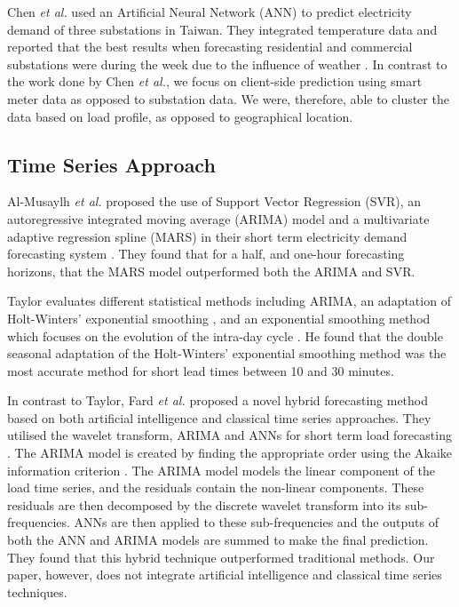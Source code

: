 Chen \textit{et al.} used an Artificial Neural Network (ANN) to predict electricity demand of three substations in Taiwan. They integrated temperature data and reported that the best results when forecasting residential and commercial substations were during the week due to the influence of weather \cite{Chen1996}. In contrast to the work done by Chen \textit{et al.}, we focus on client-side prediction using smart meter data as opposed to substation data. We were, therefore, able to cluster the data based on load profile, as opposed to geographical location.


\subsection{Time Series Approach}

Al-Musaylh \textit{et al.} proposed the use of Support Vector Regression (SVR), an autoregressive integrated moving average (ARIMA) model and a multivariate adaptive regression spline (MARS) in their short term electricity demand forecasting system \cite{Al-Musaylh2018}. They found that for a half, and one-hour forecasting horizons, that the MARS model outperformed both the ARIMA and SVR.

Taylor evaluates different statistical methods including ARIMA, an adaptation of Holt-Winters' exponential smoothing \cite{Holt2004}, and an exponential smoothing method which focuses on the evolution of the intra-day cycle \cite{Taylor2008}. He found that the double seasonal adaptation of the Holt-Winters' exponential smoothing method was the most accurate method for short lead times between 10 and 30 minutes. 

In contrast to Taylor, Fard \textit{et al.} proposed a novel hybrid forecasting method based on both artificial intelligence and classical time series approaches. They utilised the wavelet transform, ARIMA and ANNs for short term load forecasting \cite{Fard2014}. The ARIMA model is created by finding the appropriate order using the Akaike information criterion \cite{Akaike1974}. The ARIMA model models the linear component of the load time series, and the residuals contain the non-linear components. These residuals are then decomposed by the discrete wavelet transform into its sub-frequencies. ANNs are then applied to these sub-frequencies and the outputs of both the ANN and ARIMA models are summed to make the final prediction. They found that this hybrid technique outperformed traditional methods. Our paper, however, does not integrate artificial intelligence and classical time series techniques.

